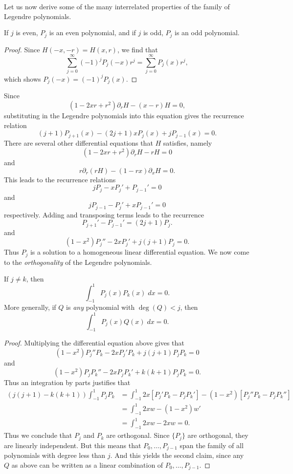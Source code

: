 Let us now derive some of the many interrelated properties of the family of Legendre polynomials.

\begin{theorem}
    If $j$ is even, $P_j$ is an even polynomial, and if $j$ is odd, $P_j$ is an odd polynomial.
\end{theorem}
\begin{proof}
    Since $H(-x,-r) = H(x,r)$, we find that
    \[ \sum_{j = 0}^\infty (-1)^j P_j(-x) r^j = \sum_{j = 0}^\infty P_j(x) r^j, \]
    which shows $P_j(-x) = (-1)^j P_j(x)$.
\end{proof}

Since
%
\[ (1 - 2xr + r^2) \partial_r H - (x - r) H = 0, \]
%
substituting in the Legendre polynomials into this equation gives the recurrence relation
%
\[ (j+1) P_{j+1}(x) - (2j + 1) x P_j(x) + j P_{j-1}(x) = 0. \]
%
There are several other differential equations that $H$ satisfies, namely
%
\[ (1 - 2xr + r^2) \partial_r H - rH = 0 \]
%
and
%
\[ r \partial_r (rH) - (1 - rx) \partial_x H = 0. \]
%
This leads to the recurrence relations
%
\[ j P_j - x P_j' + P_{j-1}' = 0 \]
%
and
%
\[ j P_{j-1} - P_j' + x P_{j-1}' = 0 \]
%
respectively. Adding and transposing terms leads to the recurrence
%
\[ P_{j+1}' - P_{j-1}' = (2j + 1) P_j. \]
%
and
%
\[ (1 - x^2) P_j'' - 2xP_j' + j(j+1) P_j = 0. \]
%
Thus $P_j$ is a solution to a homogeneous linear differential equation. We now come to the \emph{orthogonality} of the Legendre polynomials.

\begin{theorem}
    If $j \neq k$, then
    \[ \int_{-1}^1 P_j(x) P_k(x)\; dx = 0. \]
    More generally, if $Q$ is \emph{any} polynomial with $\deg(Q) < j$, then
    \[ \int_{-1}^1 P_j(x) Q(x)\; dx = 0. \]
\end{theorem}
\begin{proof}
    Multiplying the differential equation above gives that
    \[ (1 - x^2) P_j'' P_k - 2x P_j' P_k + j(j+1) P_j P_k = 0 \]
    and
    \[(1 - x^2) P_j P_k'' - 2x P_j P_k' + k(k+1) P_j P_k = 0. \]
    Thus an integration by parts justifies that
    \begin{align*}
        (j(j+1) - k(k+1)) \int_{-1}^1 P_j P_k &= \int_{-1}^1 2x [P_j' P_k - P_j P_k'] - (1 - x^2) [P_j'' P_k - P_j P_k'']\\
        &= \int_{-1}^1 2x w - (1 - x^2) w'\\
        &= \int_{-1}^1 2x w - 2x w = 0.
    \end{align*}
    Thus we conclude that $P_j$ and $P_k$ are orthogonal. Since $\{ P_j \}$ are orthogonal, they are linearly independent. But this means that $P_0,\dots,P_{j-1}$ span the family of all polynomials with degree less than $j$. And this yields the second claim, since any $Q$ as above can be written as a linear combination of $P_0,\dots,P_{j-1}$.
\end{proof}

